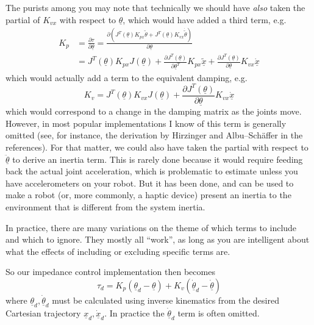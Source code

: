 \documentclass[]{article}
\begin{document}
The purists among you may note that technically we should have \textit{also} taken the partial of $K_{vx}$ with respect to $\underline{\theta}$, which would have added a third term, e.g.
\begin{equation}
 \begin{split}
    K_{p} & = \frac{\partial \tau}{\partial\underline{\theta}} = \frac{\partial ( J^{T}(\underline{\theta})K_{px}\tilde{\theta} + J^{T}(\underline{\theta})K_{vx}\dot{\tilde{\theta}})}{\partial\underline{\theta}}\\ & = J^{T}(\underline{\theta})K_{px}J(\underline{\theta}) + \frac{\partial J^{T}(\underline{\theta})}{\partial \underline{\theta}^{T}}K_{px}\tilde{\underline{x}} + \frac{\partial J^{T}(\underline{\theta})}{\partial\underline{\theta}}K_{vx}\dot{\underline{x}}
 \end{split}
\end{equation}
which would actually add a term to the equivalent damping, e.g.
\begin{equation}
 K_{v} = J^{T}(\underline{\theta})K_{vx}J(\underline{\theta}) + \frac{\partial J^{T}(\underline{\theta})}{\partial\underline{\theta}}K_{vx}\dot{\underline{x}}
\end{equation}
which would correspond to a change in the damping matrix as the joints move. However, in most popular implementations I know of this term is generally omitted (see, for instance, the derivation by Hirzinger and Albu--Sch\"affer in the references). For that matter, we could also have taken the partial with respect to $\underline{\ddot{\theta}}$ to derive an inertia term. This is rarely done because it would require feeding back the actual joint acceleration, which is problematic to estimate unless you have accelerometers on your robot. But it has been done, and can be used to make a robot (or, more commonly, a haptic device) present an inertia to the environment that is different from the  system inertia.

In practice, there are many variations on the theme of which terms to include and which to ignore. They mostly all ``work'', as long as you are intelligent about what the effects of including or excluding specific terms are.

So our impedance control implementation then becomes
\begin{equation}
 \tau_{d} = K_{p}(\underline{\theta}_{d} - \underline{\theta}) + K_{v}(\dot{\underline{\theta}}_{d} - \dot{\underline{\theta}}) \label{impedancecontrol}
\end{equation}
where $\underline{\theta}_{d}, \dot{\underline{\theta}}_{d}$ must be calculated using inverse kinematics from the desired Cartesian trajectory $\underline{x}_{d}, \dot{\underline{x}}_{d}$. In practice the $\dot{\underline{\theta}}_{d}$ term is often omitted.
\end{document}
